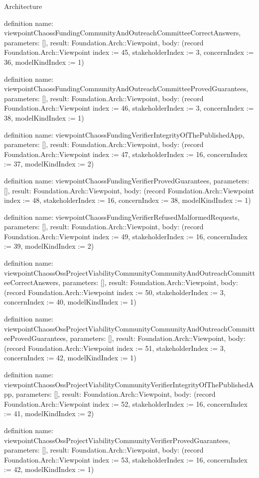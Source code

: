 \begin{lexlean}{Architecture}
\begin{semanticmodule}
definition{
  name: viewpointChaossFundingCommunityAndOutreachCommitteeCorrectAnswers,
  parameters: [],
  result: Foundation.Arch::Viewpoint,
  body: (record Foundation.Arch::Viewpoint {index := 45, stakeholderIndex := 3, concernIndex := 36, modelKindIndex := 1})
}

definition{
  name: viewpointChaossFundingCommunityAndOutreachCommitteeProvedGuarantees,
  parameters: [],
  result: Foundation.Arch::Viewpoint,
  body: (record Foundation.Arch::Viewpoint {index := 46, stakeholderIndex := 3, concernIndex := 38, modelKindIndex := 1})
}

definition{
  name: viewpointChaossFundingVerifierIntegrityOfThePublishedApp,
  parameters: [],
  result: Foundation.Arch::Viewpoint,
  body: (record Foundation.Arch::Viewpoint {index := 47, stakeholderIndex := 16, concernIndex := 37, modelKindIndex := 2})
}

definition{
  name: viewpointChaossFundingVerifierProvedGuarantees,
  parameters: [],
  result: Foundation.Arch::Viewpoint,
  body: (record Foundation.Arch::Viewpoint {index := 48, stakeholderIndex := 16, concernIndex := 38, modelKindIndex := 1})
}

definition{
  name: viewpointChaossFundingVerifierRefusedMalformedRequests,
  parameters: [],
  result: Foundation.Arch::Viewpoint,
  body: (record Foundation.Arch::Viewpoint {index := 49, stakeholderIndex := 16, concernIndex := 39, modelKindIndex := 2})
}

definition{
  name: viewpointChaossOssProjectViabilityCommunityCommunityAndOutreachCommitteeCorrectAnswers,
  parameters: [],
  result: Foundation.Arch::Viewpoint,
  body: (record Foundation.Arch::Viewpoint {index := 50, stakeholderIndex := 3, concernIndex := 40, modelKindIndex := 1})
}

definition{
  name: viewpointChaossOssProjectViabilityCommunityCommunityAndOutreachCommitteeProvedGuarantees,
  parameters: [],
  result: Foundation.Arch::Viewpoint,
  body: (record Foundation.Arch::Viewpoint {index := 51, stakeholderIndex := 3, concernIndex := 42, modelKindIndex := 1})
}

definition{
  name: viewpointChaossOssProjectViabilityCommunityVerifierIntegrityOfThePublishedApp,
  parameters: [],
  result: Foundation.Arch::Viewpoint,
  body: (record Foundation.Arch::Viewpoint {index := 52, stakeholderIndex := 16, concernIndex := 41, modelKindIndex := 2})
}

definition{
  name: viewpointChaossOssProjectViabilityCommunityVerifierProvedGuarantees,
  parameters: [],
  result: Foundation.Arch::Viewpoint,
  body: (record Foundation.Arch::Viewpoint {index := 53, stakeholderIndex := 16, concernIndex := 42, modelKindIndex := 1})
}


\end{semanticmodule}
\end{lexlean}
